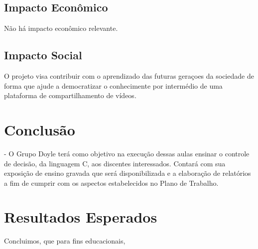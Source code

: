 \documentclass[a4paper,12pt]{article}  %
\begin{document}
 \subsection{Impacto Econômico}

  Não há impacto econômico relevante.

 \subsection{Impacto Social}

   O projeto visa contribuir com o aprendizado das futuras geraçoes da sociedade de forma que ajude a democratizar o conhecimente por intermédio de uma plataforma de compartilhamento de vídeos.



\section{Conclusão}

   -  O Grupo Doyle terá como objetivo na execução dessas aulas ensinar o controle de decisão, da linguagem C, aos discentes interessados.
 Contará com sua exposição de ensino gravada que será disponibilizada e a elaboração de relatórios a fim de cumprir com os aspectos estabelecidos no Plano de Trabalho.





\section{Resultados Esperados}



   Concluimos, que para fins educacionais,  %
\end{document}
